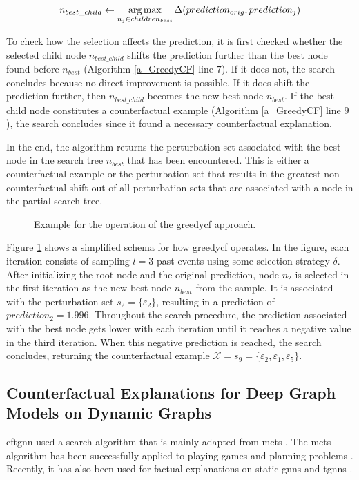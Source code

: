 \begin{equation}
    n_{best\_child} \gets \operatorname*{arg\,max}_{n_j \in children_{best}} \Delta(prediction_{orig}, prediction_j)
\end{equation}

To check how the selection affects the prediction, it is first checked whether the selected child node $n_{best\_child}$ shifts the prediction further than the best node found before $n_{best}$ (Algorithm \ref{a_GreedyCF} line $7$). If it does not, the search concludes because no direct improvement is possible. If it does shift the prediction further, then $n_{best\_child}$ becomes the new best node $n_{best}$. If the best child node constitutes a counterfactual example (Algorithm \ref{a_GreedyCF} line $9$), the search concludes since it found a necessary counterfactual explanation.

In the end, the algorithm returns the perturbation set associated with the best node in the search tree $n_{best}$ that has been encountered. This is either a counterfactual example or the perturbation set that results in the greatest non-counterfactual shift out of all perturbation sets that are associated with a node in the partial search tree.

\FloatBarrier
\begin{figure}[ht]
    \centering
    
    \caption{Example for the operation of the \gls{greedycf} approach.}
    \label{f_GreedyBaseline}
\end{figure}


Figure \ref{f_GreedyBaseline} shows a simplified schema for how \gls{greedycf} operates. In the figure, each iteration consists of sampling $l = 3$ past events using some selection strategy $\delta$. After initializing the root node and the original prediction, node $n_2$ is selected in the first iteration as the new best node $n_{best}$ from the sample. It is associated with the perturbation set $s_2 = \{\varepsilon_2\}$, resulting in a prediction of $prediction_2 = 1.996$. Throughout the search procedure, the prediction associated with the best node gets lower with each iteration until it reaches a negative value in the third iteration. When this negative prediction is reached, the search concludes, returning the counterfactual example $\mathcal{X} = s_9 = \{\varepsilon_2, \varepsilon_1, \varepsilon_5\}$.


\FloatBarrier
\subsection{Counterfactual Explanations for Deep Graph Models on Dynamic Graphs}
\label{s_Methodology_CoDy}
\acrfull{cftgnn} used a search algorithm that is mainly adapted from \gls{mcts} \cite{kocsis_bandit_2006, silver_mastering_2017}. The \gls{mcts} algorithm has been successfully applied to playing games \cite{silver_mastering_2017} and planning problems \cite{browne_survey_2012}. Recently, it has also been used for factual explanations on static \glspl{gnn} \cite{yuan_explainability_2021, zhang_gstarx_2022} and \glspl{tgnn} \cite{xia_explaining_2023}. 

